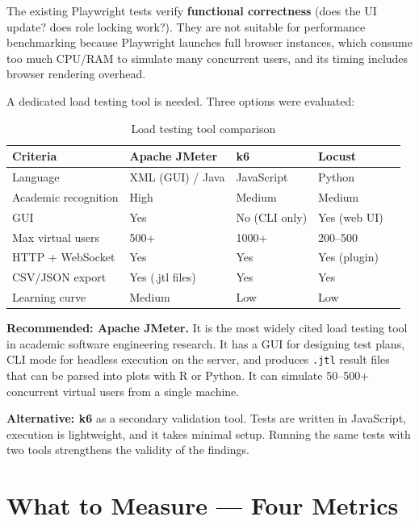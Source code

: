 \documentclass[12pt,a4paper]{article}
\begin{document}
The existing Playwright tests verify \textbf{functional correctness} (does the UI update? does role locking work?). They are not suitable for performance benchmarking because Playwright launches full browser instances, which consume too much CPU/RAM to simulate many concurrent users, and its timing includes browser rendering overhead.

A dedicated load testing tool is needed. Three options were evaluated:

\begin{table}[h]
\centering
\small
\begin{tabular}{@{}lllll@{}}
\toprule
\textbf{Criteria} & \textbf{Apache JMeter} & \textbf{k6} & \textbf{Locust} \\
\midrule
Language & XML (GUI) / Java & JavaScript & Python \\
Academic recognition & High & Medium & Medium \\
GUI & Yes & No (CLI only) & Yes (web UI) \\
Max virtual users & 500+ & 1000+ & 200--500 \\
HTTP + WebSocket & Yes & Yes & Yes (plugin) \\
CSV/JSON export & Yes (.jtl files) & Yes & Yes \\
Learning curve & Medium & Low & Low \\
\bottomrule
\end{tabular}
\caption{Load testing tool comparison}
\end{table}

\begin{recbox}
\textbf{Recommended: Apache JMeter.} It is the most widely cited load testing tool in academic software engineering research. It has a GUI for designing test plans, CLI mode for headless execution on the server, and produces \texttt{.jtl} result files that can be parsed into plots with R or Python. It can simulate 50--500+ concurrent virtual users from a single machine.

\textbf{Alternative: k6} as a secondary validation tool. Tests are written in JavaScript, execution is lightweight, and it takes minimal setup. Running the same tests with two tools strengthens the validity of the findings.
\end{recbox}

\section{What to Measure --- Four Metrics}
\end{document}
